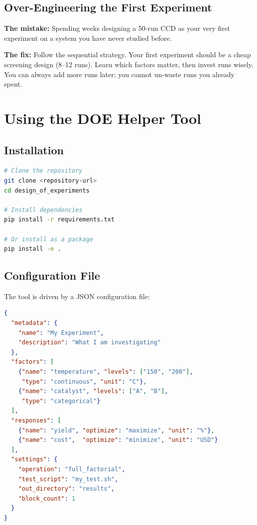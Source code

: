 \documentclass[11pt]{book}
\begin{document}
\section{Over-Engineering the First Experiment}

\textbf{The mistake:} Spending weeks designing a 50-run CCD as your very first
experiment on a system you have never studied before.

\textbf{The fix:} Follow the sequential strategy. Your first experiment should
be a cheap screening design (8--12 runs). Learn which factors matter, then
invest runs wisely. You can always add more runs later; you cannot un-waste runs
you already spent.


\chapter{Using the DOE Helper Tool}

\section{Installation}

\begin{lstlisting}[language=bash]
# Clone the repository
git clone <repository-url>
cd design_of_experiments

# Install dependencies
pip install -r requirements.txt

# Or install as a package
pip install -e .
\end{lstlisting}

\section{Configuration File}

The tool is driven by a JSON configuration file:

\begin{lstlisting}[language=json]
{
  "metadata": {
    "name": "My Experiment",
    "description": "What I am investigating"
  },
  "factors": [
    {"name": "temperature", "levels": ["150", "200"],
     "type": "continuous", "unit": "C"},
    {"name": "catalyst", "levels": ["A", "B"],
     "type": "categorical"}
  ],
  "responses": [
    {"name": "yield", "optimize": "maximize", "unit": "%"},
    {"name": "cost",  "optimize": "minimize", "unit": "USD"}
  ],
  "settings": {
    "operation": "full_factorial",
    "test_script": "my_test.sh",
    "out_directory": "results",
    "block_count": 1
  }
}
\end{lstlisting}
\end{document}
